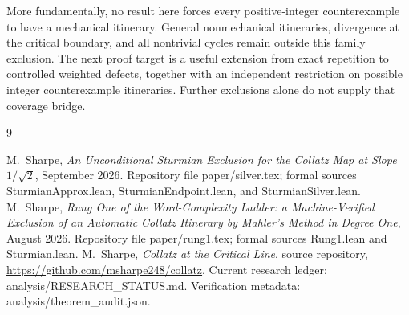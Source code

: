 \documentclass[11pt]{article}
\theoremstyle{remark}
\newcommand{\code}[1]{{\small\ttfamily #1}}
\begin{document}
More fundamentally, no result here forces every positive-integer
counterexample to have a mechanical itinerary. General nonmechanical
itineraries, divergence at the critical boundary, and all nontrivial
cycles remain outside this family exclusion. The next proof target is a
useful extension from exact repetition to controlled weighted defects,
together with an independent restriction on possible integer
counterexample itineraries. Further exclusions alone do not supply that
coverage bridge.

\begin{thebibliography}{9}
\raggedright
{} M.~Sharpe, \emph{An Unconditional Sturmian Exclusion for
the Collatz Map at Slope $1/\sqrt2$}, September 2026.
Repository file \code{paper/silver.tex}; formal sources
\code{SturmianApprox.lean}, \code{SturmianEndpoint.lean}, and
\code{SturmianSilver.lean}.
 M.~Sharpe, \emph{Rung One of the Word-Complexity Ladder:
a Machine-Verified Exclusion of an Automatic Collatz Itinerary by
Mahler's Method in Degree One}, August 2026.
Repository file \code{paper/rung1.tex}; formal sources
\code{Rung1.lean} and \code{Sturmian.lean}.
 M.~Sharpe, \emph{Collatz at the Critical Line}, source
repository, \url{https://github.com/msharpe248/collatz}.
Current research ledger: \code{analysis/RESEARCH\_\allowbreak{}STATUS.md}.
Verification metadata: \code{analysis/theorem\_\allowbreak{}audit.json}.
\end{thebibliography}
\end{document}
